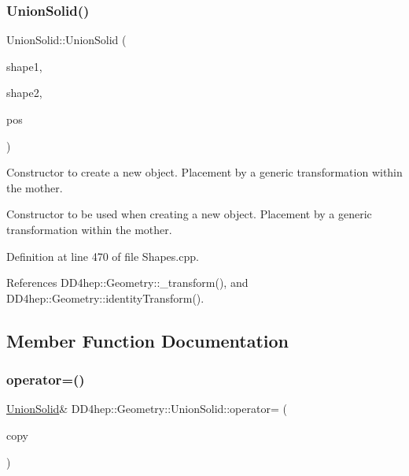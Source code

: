 \subsubsection{\texorpdfstring{Union\+Solid()}{UnionSolid()}\hspace{0.1cm}{\footnotesize\ttfamily [8/8]}}
{\footnotesize\ttfamily Union\+Solid\+::\+Union\+Solid (\begin{DoxyParamCaption}\item[{const \hyperlink{namespace_d_d4hep_1_1_geometry_a83de90a8dcc7378ba47d54ef9a6a687b}{Solid} \&}]{shape1,  }\item[{const \hyperlink{namespace_d_d4hep_1_1_geometry_a83de90a8dcc7378ba47d54ef9a6a687b}{Solid} \&}]{shape2,  }\item[{const \hyperlink{namespace_d_d4hep_1_1_geometry_aeb4c0356d12fd7be49a0aae50514e64b}{Transform3D} \&}]{pos }\end{DoxyParamCaption})}



Constructor to create a new object. Placement by a generic transformation within the mother. 

Constructor to be used when creating a new object. Placement by a generic transformation within the mother. 

Definition at line 470 of file Shapes.\+cpp.



References D\+D4hep\+::\+Geometry\+::\+\_\+transform(), and D\+D4hep\+::\+Geometry\+::identity\+Transform().



\subsection{Member Function Documentation}
\hypertarget{class_d_d4hep_1_1_geometry_1_1_union_solid_a661d210303700b108af32bcbf1252a67}{}\label{class_d_d4hep_1_1_geometry_1_1_union_solid_a661d210303700b108af32bcbf1252a67} 
\subsubsection{\texorpdfstring{operator=()}{operator=()}}
{\footnotesize\ttfamily \hyperlink{class_d_d4hep_1_1_geometry_1_1_union_solid}{Union\+Solid}\& D\+D4hep\+::\+Geometry\+::\+Union\+Solid\+::operator= (\begin{DoxyParamCaption}\item[{const \hyperlink{class_d_d4hep_1_1_geometry_1_1_union_solid}{Union\+Solid} \&}]{copy }\end{DoxyParamCaption})\hspace{0.3cm}{\ttfamily [default]}}



